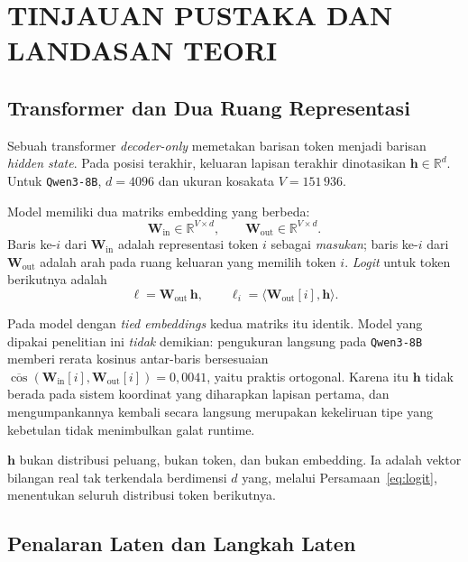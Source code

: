 \documentclass{laporanta1statugm}
\newcommand{\code}[1]{\texttt{#1}}
\begin{document}
\chapter{TINJAUAN PUSTAKA DAN LANDASAN TEORI}

\section{Transformer dan Dua Ruang Representasi}

Sebuah transformer \textit{decoder-only} \citep{vaswani} memetakan barisan
token menjadi barisan \textit{hidden state}. Pada posisi terakhir, keluaran
lapisan terakhir dinotasikan $\bm{h}\in\mathbb{R}^{d}$. Untuk \code{Qwen3-8B},
$d = 4096$ dan ukuran kosakata $V = 151\,936$.

Model memiliki dua matriks embedding yang berbeda:
\[
  \bm{W}_{\text{in}}\in\mathbb{R}^{V\times d}, \qquad
  \bm{W}_{\text{out}}\in\mathbb{R}^{V\times d}.
\]
Baris ke-$i$ dari $\bm{W}_{\text{in}}$ adalah representasi token $i$ sebagai
\emph{masukan}; baris ke-$i$ dari $\bm{W}_{\text{out}}$ adalah arah pada ruang
keluaran yang memilih token $i$. \textit{Logit} untuk token berikutnya adalah
\begin{equation}
  \bm{\ell} = \bm{W}_{\text{out}}\,\bm{h}, \qquad
  \ell_i = \langle \bm{W}_{\text{out}}[i], \bm{h}\rangle .
  \label{eq:logit}
\end{equation}

Pada model dengan \textit{tied embeddings} kedua matriks itu identik. Model
yang dipakai penelitian ini \emph{tidak} demikian: pengukuran langsung pada
\code{Qwen3-8B} memberi rerata kosinus antar-baris bersesuaian
$\overline{\cos}(\bm{W}_{\text{in}}[i], \bm{W}_{\text{out}}[i]) = 0{,}0041$,
yaitu praktis ortogonal. Karena itu $\bm{h}$ tidak berada pada sistem koordinat
yang diharapkan lapisan pertama, dan mengumpankannya kembali secara langsung
merupakan kekeliruan tipe yang kebetulan tidak menimbulkan galat runtime.

\begin{teorema}
$\bm{h}$ bukan distribusi peluang, bukan token, dan bukan embedding. Ia adalah
vektor bilangan real tak terkendala berdimensi $d$ yang, melalui
Persamaan~\eqref{eq:logit}, menentukan seluruh distribusi token berikutnya.
\end{teorema}

\section{Penalaran Laten dan Langkah Laten}
\end{document}
